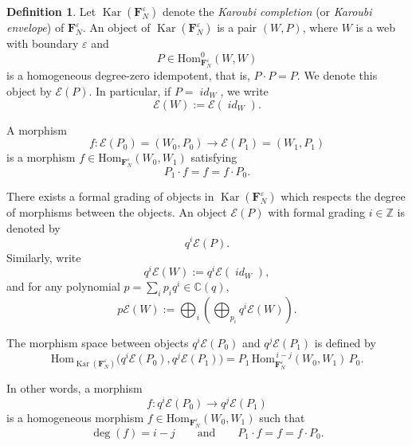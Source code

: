 \documentclass[12pt]{amsart}
\theoremstyle{definition}
\newtheorem{definition}[theorem]{Definition}
\theoremstyle{remark}
\newtheorem{remark}[theorem]{Remark}
\numberwithin{equation}{section}
\numberwithin{figure}{section}
\newcommand{\C}{\mathbb{C}}
\newcommand{\Hom}{\mathrm{Hom}}
\newcommand{\Kar}{\operatorname{Kar}}
\newcommand{\Foam}{\mathbf{F}_N}
\newcommand{\foamdeg}{\deg_N}
\newcommand{\osum}{\bigoplus}
\DeclareMathOperator{\idfoam}{\mathit{id}}
\begin{document}
\begin{definition}\label{def:Karoubi of cornered foams}
Let $\Kar(\Foam^\varepsilon)$ denote the \emph{Karoubi
completion} (or \emph{Karoubi envelope}) of $\Foam^\varepsilon$. An object
of $\Kar(\Foam^\varepsilon)$ is a pair $(W,P)$, where $W$ is
a web with boundary $\varepsilon$ and
\[
P\in
\Hom^0_{\Foam^\varepsilon}(W,W)
\]
is a homogeneous degree-zero idempotent, that is,
$P\cdot P=P$.
We denote this object by $\mathcal{E}(P)$. In particular, if
$P=\idfoam_W$, we write
\[
\mathcal{E}(W):=\mathcal{E}(\idfoam_W).
\]

A morphism
\[
f\colon\mathcal{E}(P_0)=(W_0,P_0)
\longrightarrow\mathcal{E}(P_1)=(W_1,P_1)
\]
is a morphism $f\in\Hom_{\Foam^\varepsilon}(W_0,W_1)$ satisfying
\[
P_1\cdot f=f=f\cdot P_0.
\]

There exists a formal grading of objects in
$\Kar(\Foam^\varepsilon)$ which respects the degree of
morphisms between the objects. An object $\mathcal{E}(P)$ with formal
grading $i\in\mathbb{Z}$ is denoted by
\[
q^i\mathcal{E}(P).
\]
Similarly, write
\[
q^i\mathcal{E}(W):=q^i\mathcal{E}(\idfoam_W),
\]
and for any polynomial $p=\sum_ip_iq^i \in \C(q)$, 
\[
p\mathcal{E}(W):=\osum_i(\osum_{p_i}q^i\mathcal{E}(W)).
\]


The morphism space between objects $q^i\mathcal{E}(P_0)$ and
$q^j\mathcal{E}(P_1)$ is defined by
\[
\Hom_{\Kar(\Foam^\varepsilon)}
\bigl(q^i\mathcal{E}(P_0),q^j\mathcal{E}(P_1)\bigr)
=P_1\,\Hom_{\Foam^\varepsilon}^{\,i-j}(W_0,W_1)\,P_0.
\]

In other words, a morphism
\[
f\colon q^i\mathcal{E}(P_0)
\longrightarrow q^j\mathcal{E}(P_1)
\]
is a homogeneous morphism $f\in\Hom_{\Foam^\varepsilon}(W_0,W_1)$ such
that
\[
\deg(f)=i-j
\qquad\text{and}\qquad
P_1\cdot f=f=f\cdot P_0.
\]
\end{definition}

\end{document}
